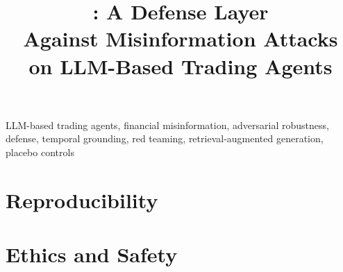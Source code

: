 \documentclass[conference]{IEEEtran}
\newif\ifanonymous
\begin{document}

\title{\rhal{}: A Defense Layer\\Against Misinformation Attacks\\on LLM-Based Trading Agents}

\ifanonymous
\author{\IEEEauthorblockN{Anonymous Authors}\IEEEauthorblockA{\textit{Paper under double-blind review}}}
\else
\author{
}
\fi

\maketitle

\begin{abstract}

\end{abstract}

\begin{IEEEkeywords}
LLM-based trading agents, financial misinformation, adversarial robustness, defense, temporal grounding, red teaming, retrieval-augmented generation, placebo controls
\end{IEEEkeywords}











\section*{Reproducibility}


\section*{Ethics and Safety}





\suppressfloats[t]%
\appendices

\end{document}
